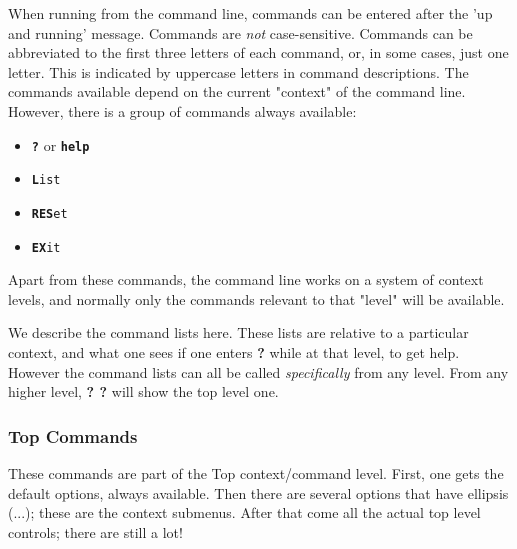    When running from the command line, commands
   can be entered after the 'up and running' message.
   Commands are \textsl{not} case-sensitive.
   Commands can be abbreviated to the first three letters of each command,
   or, in some cases, just one letter.  This is indicated by
   uppercase letters in command descriptions.
   The commands available depend on the current "context" of the command line.
   However, there is a group of commands always available:

   \begin{itemize}
      \item \texttt{\textbf{?}} or \texttt{\textbf{help}}
      \item \texttt{\textbf{L}ist}
      \item \texttt{\textbf{RES}et}
      \item \texttt{\textbf{EX}it}
   \end{itemize}

   Apart from these commands, the command line works on a system of
   context levels, and normally only the commands relevant to that "level"
   will be available.


   We describe the command lists here. These lists are relative to
   a particular context, and what one sees if one enters
   \textbf{?} while at that level, to get help.
   However the command lists can all be called \textsl{specifically} from any
   level. From any higher level, \textbf{? ?} will show the top level one.

\subsubsection{Top Commands}
\label{subsec:command_line_top_command_list}

   These commands are part of the Top context/command level.
   First, one gets the default options, always available.
   Then there are several options that have ellipsis (...);
   these are the context submenus.
   After that come all the actual top level controls; there are still a lot!

